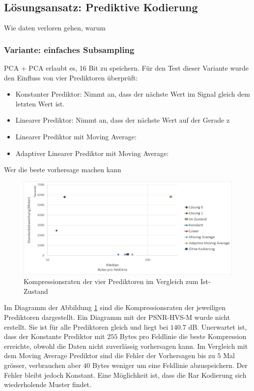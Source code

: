 \subsection{Lösungsansatz: Prediktive Kodierung}
Wie daten verloren gehen, warum 

\subsubsection{Variante: einfaches Subsampling}
PCA + PCA erlaubt es, 16 Bit zu speichern.
Für den Test dieser Variante wurde den Einfluss von vier Prediktoren überprüft:
\begin{itemize}
\item Konstanter Prediktor: Nimmt an, dass der nächste Wert im Signal gleich dem letzten Wert ist.
\item Linearer Prediktor: Nimmt an, dass der nächste Wert auf der Gerade z
\item Linearer Prediktor mit Moving Average: 
\item Adaptiver Linearer Prediktor mit Moving Average:
\end{itemize}
Wer die beste vorhersage machen kann
\begin{figure}[!htbp]
	\center
	\includegraphics[width=1\textwidth,keepaspectratio]{./pictures/resultate/loesung2/variante0/resultate.png}
	\caption{Kompressionsraten der vier Prediktoren im Vergleich zum Ist-Zustand}
	\label{resultate:loesung2:simple:resultate}
\end{figure}
Im Diagramm der Abbildung \ref{resultate:loesung2:simple:resultate} sind die Kompressionsraten der jeweiligen Prediktoren dargestellt. Ein Diagramm mit der PSNR-HVS-M wurde nicht erstellt. Sie ist für alle Prediktoren gleich und liegt bei $140.7$ dB. Unerwartet ist, dass der Konstante Prediktor mit $255$ Bytes pro Feldlinie die beste Kompression erreichte, obwohl die Daten nicht zuverlässig vorhersagen kann. Im Vergleich mit dem Moving Average Prediktor sind die Fehler der Vorhersagen bis zu $5$ Mal grösser, verbrauchen aber $40$ Bytes weniger um eine Feldlinie abzuspeichern. Der Fehler bleibt jedoch Konstant. Eine Möglichkeit ist, dass die Rar Kodierung sich wiederholende Muster findet.\\
